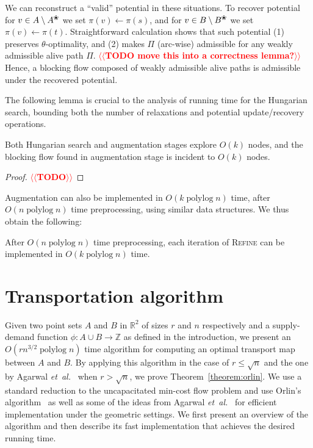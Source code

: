 \documentclass[11pt]{article}
\makeatletter
\def\etal{\emph{et~al.}}
\def\etal{\textit{et~al.}}
\def\polylog{\mathop{\mathrm{polylog}}}
\def\reals{\mathbb{R}}
\def\ints{\mathbb{Z}}
\def\tsupply{\phi}
\def\alive#1{{#1}^\text{\ding{96}}}
\def\dead#1{{#1} \setminus \alive{#1}}
\theoremstyle{plain}
\numberwithin{figure}{section}
\def\n@te#1{\textsf{\boldmath \textbf{$\langle\!\langle$#1$\rangle\!\rangle$}}\leavevmode}
\def\note#1{\textcolor{red}{\n@te{#1}}}
\makeatother
\begin{document}
We can reconstruct a ``valid'' potential in these situations.
To recover potential for $v \in \dead{A}$ we set $\pi(v) \gets \pi(s)$,
and for $v \in \dead{B}$ we set $\pi(v) \gets \pi(t)$.
Straightforward calculation shows that such potential (1) preserves $\theta$-optimality,
and (2) makes $\Pi$ (arc-wise) admissible for any weakly admissible alive path $\Pi$.
\note{TODO move this into a correctness lemma?} %
Hence, a blocking flow composed of weakly admissible alive paths is admissible
under the recovered potential.

The following lemma is crucial to the analysis of running time for the Hungarian search,
bounding both the number of relaxations and potential update/recovery operations.

\begin{lemma}
\label{lemma:cost_scale_count}
Both Hungarian search and augmentation stages explore $O(k)$ nodes,
and the blocking flow found in augmentation stage is incident to $O(k)$ nodes.
\end{lemma}
\begin{proof}
\note{TODO} %
\end{proof}

Augmentation can also be implemented in $O(k\polylog n)$ time, after
$O(n\polylog n)$ time preprocessing, using similar data structures.
We thus obtain the following:

\begin{lemma}
\label{lemma:refine_iter_time}
After $O(n\polylog n)$ time preprocessing, each iteration of \textsc{Refine} can be
implemented in $O(k\polylog n)$ time.
\end{lemma}


\section{Transportation algorithm}
\label{section:orlin}

Given two point sets $A$ and $B$ in $\reals^2$ of sizes $r$ and $n$ respectively
and a supply-demand function $\tsupply: A \cup B \to \ints$
as defined in the introduction, we present an $O(rn^{3/2}\polylog n)$ time
algorithm for computing an optimal transport map between $A$ and $B$.
By applying this algorithm in the case of $r \leq \sqrt{n}$ and the one by
Agarwal \etal~\cite{AFPVX17arxiv} when $r > \sqrt{n}$, we prove Theorem~\ref{theorem:orlin}.
We use a standard reduction to the uncapacitated min-cost flow problem and use
Orlin's algorithm~\cite{O93} as well as some of
the ideas from Agarwal \etal~\cite{AFPVX17arxiv} for efficient implementation under the geometric settings.
We first present an overview of the algorithm and then describe its fast
implementation that achieves the desired running time.
\end{document}
